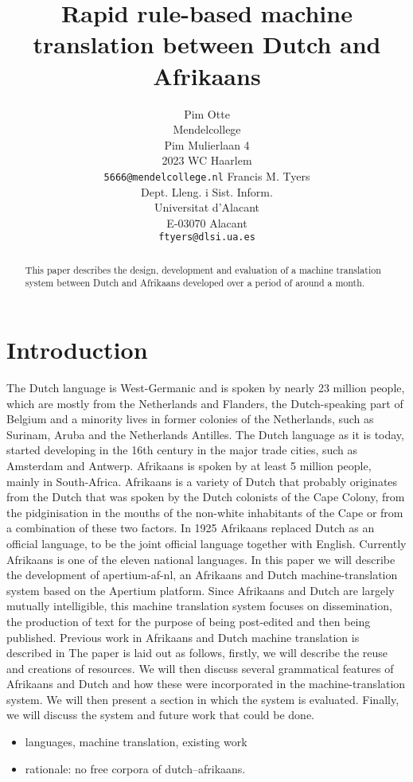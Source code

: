 \documentclass[11pt]{article}
\title{Rapid rule-based machine translation between Dutch and Afrikaans}
\author{Pim Otte\\
  Mendelcollege\\
  Pim Mulierlaan 4\\
  2023 WC Haarlem\\
  {\tt 5666@mendelcollege.nl}  \And
  Francis M. Tyers\\
  Dept. Lleng. i Sist. Inform.\\
  Universitat d'Alacant\\
  E-03070 Alacant \\
  {\tt ftyers@dlsi.ua.es}}
\date{}
\begin{document}
\maketitle
\begin{abstract}
 This paper describes the design, development and evaluation of a machine
 translation system between Dutch and Afrikaans developed over a period of
 around a month.
\end{abstract}

\section{Introduction}

The Dutch language is West-Germanic and is spoken by nearly 23 million people, which are mostly from the Netherlands and Flanders, the Dutch-speaking part of Belgium and a minority lives in former colonies of the Netherlands, such as Surinam, Aruba and the Netherlands Antilles. The Dutch language as it is today, started developing in the 16th century in the major trade cities, such as Amsterdam and Antwerp. \cite{Shetter:02}  Afrikaans is spoken by at least 5 million people, mainly in South-Africa. Afrikaans is a variety of Dutch that probably originates from the Dutch that was spoken by the Dutch colonists of the Cape Colony, from the pidginisation in the mouths of  the non-white inhabitants of the Cape or from a combination of these two factors. In 1925 Afrikaans replaced Dutch as an official language, to be the joint official language together with English. Currently Afrikaans is one of the eleven national languages. \cite{Donaldson:93}
In this paper we will describe the development of apertium-af-nl, an Afrikaans and Dutch machine-translation system based on the Apertium platform. Since Afrikaans and Dutch are largely mutually intelligible, this machine translation system focuses on dissemination, the production of text for the purpose of being post-edited and then being published. Previous work in Afrikaans and Dutch machine translation is described in \cite{Huyssteen:09} 
The paper is laid out as follows, firstly, we will describe the reuse and creations of resources. We will then discuss several grammatical features of Afrikaans and Dutch and how these were incorporated in the machine-translation system. We will then present a section in which the system is evaluated. Finally, we will discuss the system and future work that could be done.


\begin{itemize}
\item languages, machine translation, existing work
\item rationale: no free corpora of dutch--afrikaans.
\end{itemize}
\end{document}
